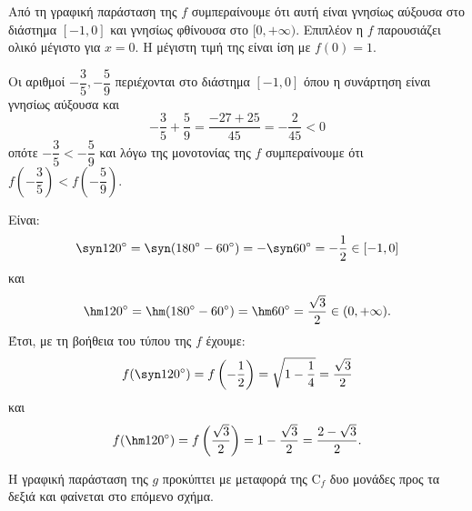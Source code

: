 \begin{alist}
\item Από τη γραφική παράσταση της $f$ συμπεραίνουμε ότι αυτή είναι γνησίως αύξουσα στο διάστημα $[-1, 0]$ και γνησίως φθίνουσα στο $[0, +\infty)$. Επιπλέον η $f$ παρουσιάζει ολικό μέγιστο για $x = 0$. Η μέγιστη τιμή της είναι ίση με $f(0) = 1$.
\item Οι αριθμοί $-\dfrac{3}{5}, -\dfrac{5}{9}$ περιέχονται στο διάστημα $[-1, 0]$ όπου η συνάρτηση είναι γνησίως αύξουσα και
\[-\frac{3}{5} + \frac{5}{9} = \frac{-27+25}{45} = -\frac{2}{45} < 0\]
οπότε $-\dfrac{3}{5} < -\dfrac{5}{9}$ και λόγω της μονοτονίας της $f$ συμπεραίνουμε ότι $f\left(-\dfrac{3}{5}\right) < f\left(-\dfrac{5}{9}\right)$.
\item Είναι:
\[\syn  120^\circ = \syn (180^\circ - 60^\circ) = -\syn  60^\circ = -\frac{1}{2} \in [-1, 0]\]
και 
\[\hm  120^\circ = \hm (180^\circ - 60^\circ) = \hm  60^\circ = \frac{\sqrt{3}}{2} \in (0, +\infty).\]
Έτσι, με τη βοήθεια του τύπου της $f$ έχουμε:
\[f(\syn  120^\circ) = f\left(-\frac{1}{2}\right) = \sqrt{1 - \frac{1}{4}} = \frac{\sqrt{3}}{2}\]
και 
\[f(\hm  120^\circ) = f\left(\frac{\sqrt{3}}{2}\right) = 1 - \frac{\sqrt{3}}{2} = \frac{2 - \sqrt{3}}{2}.\]
\item Η γραφική παράσταση της $g$ προκύπτει με μεταφορά της $\text{C}_f$ δυο μονάδες προς τα δεξιά και φαίνεται στο επόμενο σχήμα.
\end{alist}
\begin{center}
\end{center}

